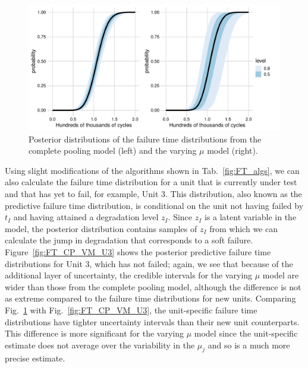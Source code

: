 \begin{figure}[h]
    \centering
    \includegraphics[width=0.95\columnwidth]{./figures/ch-5/FT_dist.pdf}
    \caption{Posterior distributions of the failure time distributions from the complete pooling model (left) and the varying $\mu$ model (right).}
    \label{fig:FT_CP_VM_new}
\end{figure}

Using slight modifications of the algorithms shown in Tab.~\ref{fig:FT_algs}, we can also calculate the failure time distribution for a unit that is currently under test and that has yet to fail, for example, Unit 3. This distribution, also known as the predictive failure time distribution\citep{lawless2004}, is conditional on the unit not having failed by $t_I$ and having attained a degradation level $z_I$. Since $z_I$ is a latent variable in the model, the posterior distribution contains samples of $z_I$ from which we can calculate the jump in degradation that corresponds to a soft failure. Figure~\ref{fig:FT_CP_VM_U3} shows the posterior predictive failure time distributions for Unit 3, which has not failed; again, we see that because of the additional layer of uncertainty, the credible intervals for the varying $\mu$ model are wider than those from the complete pooling model, although the difference is not as extreme compared to the failure time distributions for new units. Comparing Fig.~\ref{fig:FT_CP_VM_new} with Fig.~\ref{fig:FT_CP_VM_U3}, the unit-specific failure time distributions have tighter uncertainty intervals than their new unit counterparts. This difference is more significant for the varying $\mu$ model since the unit-specific estimate does not average over the variability in the $\mu_j$ and so is a much more precise estimate.

